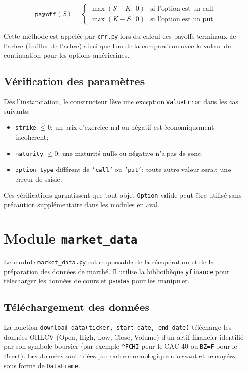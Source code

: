 \documentclass[11pt]{report}
\begin{document}
\[
\texttt{payoff}(S) =
\begin{cases}
\max(S - K,\; 0) & \text{si l'option est un call,} \\
\max(K - S,\; 0) & \text{si l'option est un put.}
\end{cases}
\]

Cette méthode est appelée par \texttt{crr.py} lors du calcul des payoffs
terminaux de l'arbre (feuilles de l'arbre) ainsi que lors de la comparaison
avec la valeur de continuation pour les options américaines.

\subsection{Vérification des paramètres}

Dès l'instanciation, le constructeur lève une exception \texttt{ValueError}
dans les cas suivants:
\begin{itemize}
    \item \texttt{strike} $\leq 0$: un prix d'exercice nul ou négatif est économiquement incohérent;
    \item \texttt{maturity} $\leq 0$: une maturité nulle ou négative n'a pas de sens;
    \item \texttt{option\_type} différent de \texttt{'call'} ou \texttt{'put'}: toute autre valeur
    serait une erreur de saisie.
\end{itemize}

Ces vérifications garantissent que tout objet \texttt{Option} valide peut être
utilisé sans précaution supplémentaire dans les modules en aval.

\section{Module \texttt{market\_data}}

Le module \texttt{market\_data.py} est responsable de la récupération et de la
préparation des données de marché. Il utilise la bibliothèque \texttt{yfinance}
pour télécharger les données de cours et \texttt{pandas} pour les manipuler.

\subsection{Téléchargement des données}

La fonction \texttt{download\_data(ticker, start\_date, end\_date)} télécharge
les données OHLCV (Open, High, Low, Close, Volume) d'un actif financier
identifié par son symbole boursier (par exemple \texttt{\^{}FCHI} pour le CAC 40
ou \texttt{BZ=F} pour le Brent). Les données sont triées par ordre chronologique
croissant et renvoyées sous forme de \texttt{DataFrame}.
\end{document}
